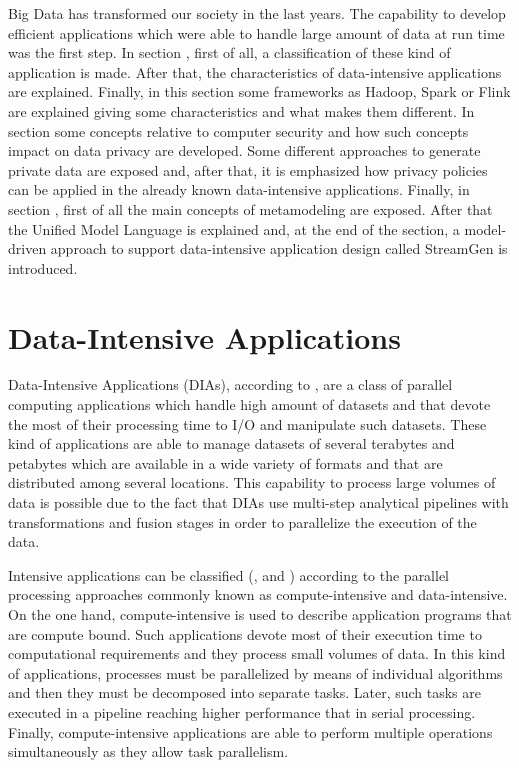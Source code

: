 Big Data has transformed our society in the last years. The capability to develop efficient applications which were able to handle large amount of data at run time was the first step. In section , first of all, a classification of these kind of application is made. After that, the characteristics of data-intensive applications are explained. Finally, in this section some frameworks as Hadoop, Spark or Flink are explained giving some characteristics and what makes them different. In section  some concepts relative to computer security and how such concepts impact on data privacy are developed. Some different approaches to generate private data are exposed and, after that, it is emphasized how privacy policies can be applied in the already known data-intensive applications. Finally, in section , first of all the main concepts of metamodeling are exposed. After that the Unified Model Language is explained and, at the end of the section, a model-driven approach to support data-intensive application design called StreamGen is introduced.

\section{Data-Intensive Applications}

\label{Data-Intensive Applications}

Data-Intensive Applications (DIAs), according to \cite{cloudcomputing}, are a class of parallel computing applications which handle high amount of datasets and that devote the most of their processing time to I/O and manipulate such datasets. These kind of applications are able to manage datasets of several terabytes and petabytes which are available in a wide variety of formats and that are distributed among several locations. This capability to process large volumes of data is possible due to the fact that DIAs use multi-step analytical pipelines with transformations and fusion stages in order to parallelize the execution of the data.

Intensive applications can be classified (\cite{parallelcomputing}, \cite{computing21} and \cite{dataintensivecomputing}) according to the parallel processing approaches commonly known as compute-intensive and data-intensive. On the one hand, compute-intensive is used to describe application programs that are compute bound. Such applications devote most of their execution time to computational requirements and they process small volumes of data. In this kind of applications, processes must be parallelized by means of individual algorithms and then they must be decomposed into separate tasks. Later, such tasks are executed in a pipeline reaching higher performance that in serial processing. Finally, compute-intensive applications are able to perform multiple operations simultaneously as they allow task parallelism.


